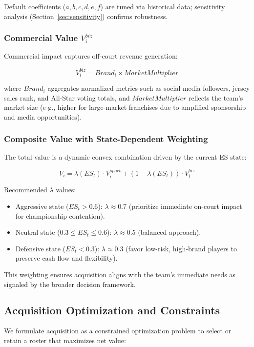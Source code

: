 \documentclass{mcmthesis}
\begin{document}
Default coefficients ($a,b,c,d,e,f$) are tuned via historical data; sensitivity analysis (Section~\ref{sec:sensitivity}) confirms robustness.

\subsubsection{Commercial Value $V^{biz}_i$}
Commercial impact captures off-court revenue generation:

\[
V^{biz}_i = Brand_i \times MarketMultiplier
\]

where $Brand_i$ aggregates normalized metrics such as social media followers, jersey sales rank, and All-Star voting totals, and $MarketMultiplier$ reflects the team's market size (e  g., higher for large-market franchises due to amplified sponsorship and media opportunities).

\subsubsection{Composite Value with State-Dependent Weighting}
The total value is a dynamic convex combination driven by the current ES state:

\[
V_i = \lambda(ES_t) \cdot V^{sport}_i + (1 - \lambda(ES_t)) \cdot V^{biz}_i
\]

Recommended $\lambda$ values:
\begin{itemize}
    \item Aggressive state ($ES_t > 0.6$): $\lambda \approx 0.7$ (prioritize immediate on-court impact for championship contention).
    \item Neutral state ($0.3 \leq ES_t \leq 0.6$): $\lambda \approx 0.5$ (balanced approach).
    \item Defensive state ($ES_t < 0.3$): $\lambda \approx 0.3$ (favor low-risk, high-brand players to preserve cash flow and flexibility).
\end{itemize}

This weighting ensures acquisition aligns with the team's immediate needs as signaled by the broader decision framework.

\subsection{Acquisition Optimization and Constraints}

We formulate acquisition as a constrained optimization problem to select or retain a roster that maximizes net value:
\end{document}
